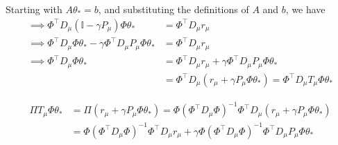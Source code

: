 Starting with \( A \theta_\ast = b \), and substituting the definitions of \( A \) and \( b \), we have
\begin{align*}
    \implies
    \Phi^{\top} D_{\mu}\left(\mathbb{I}-\gamma P_{\mu}\right) \Phi \theta_\ast
     & =
    \Phi^{\top} D_{\mu} r_{\mu}
    \\
    \implies
    \Phi^{\top} D_{\mu} \Phi \theta_\ast - \gamma \Phi^{\top} D_{\mu} P_{\mu} \Phi \theta_\ast
     & =
    \Phi^{\top} D_{\mu} r_{\mu}
    \\
    \implies
    \Phi^{\top} D_{\mu} \Phi \theta_\ast
     & =
    \Phi^{\top} D_{\mu} r_{\mu} + \gamma \Phi^{\top} D_{\mu} P_{\mu} \Phi \theta_\ast
    \\ & =
    \Phi^{\top} D_{\mu} \left( r_{\mu} + \gamma P_{\mu} \Phi \theta_\ast \right)
    =
    \Phi^{\top} D_{\mu} T_{\mu} \Phi \theta_\ast
\end{align*}

\begin{align*}
    \Pi T_{\mu} \Phi \theta_\ast
     & =
    \Pi \left( r_{\mu} + \gamma P_{\mu} \Phi \theta_\ast \right)
    =
    \Phi{\left(\Phi^{\top} D_{\mu} \Phi\right)}^{-1} \Phi^{\top} D_{\mu} \left( r_{\mu} + \gamma P_{\mu} \Phi \theta_\ast \right)
    \\ & =
    \Phi{\left(\Phi^{\top} D_{\mu} \Phi\right)}^{-1} \Phi^{\top} D_{\mu} r_{\mu} + \gamma \Phi{\left(\Phi^{\top} D_{\mu} \Phi\right)}^{-1} \Phi^{\top} D_{\mu} P_{\mu} \Phi \theta_\ast
\end{align*}

